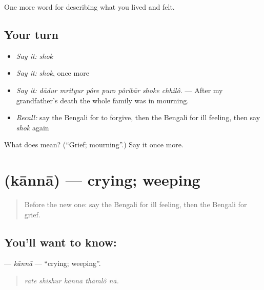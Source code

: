 \begin{grammarlens}[title={What you've built}]
One more word for describing what you lived and felt.
\end{grammarlens}

\subsection*{Your turn}
\begin{itemize}
\raggedright
  \item \emph{Say it:} \emph{shok}
  \item \emph{Say it:} \emph{shok}, once more
  \item \emph{Say it:} \emph{dādur mrityur pôre puro pôribār shoke chhilô.} — After my grandfather's death the whole family was in mourning.
  \item \emph{Recall:} say the Bengali for to forgive, then the Bengali for ill feeling, then say \emph{shok} again
\end{itemize}

\begin{tcolorbox}[breakable,colback=teal!4,colframe=teal!35!black,title={Before you move on}]
What does  mean? (\textquotedblleft{}Grief; mourning\textquotedblright{}.) Say it once more.
\end{tcolorbox}
\section[\texorpdfstring{\bn{কান্না} (kānnā)}{কান্না (kānnā)}]{ (kānnā) — crying; weeping}

\label{lesson:BN-C445-kanna}



\begin{quote}
Before the new one: say the Bengali for ill feeling, then the Bengali for grief.
\end{quote}

\subsection*{You'll want to know: }
\textbf{} — \emph{kānnā} — \textquotedblleft{}crying; weeping\textquotedblright{}.

\begin{quote}
    
\end{quote}

\begin{quote}
\emph{rāte shishur kānnā thāmlô nā.}
\end{quote}

